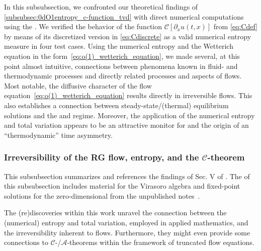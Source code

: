 In this subsubsection, we confronted our theoretical findings of \cref{subsubsec:0dO1entropy_c-function_tvd} with direct numerical computations using the \ktScheme{}.
We verified the behavior of the function $\mathcal{C} [ \partial_x u ( t, x ) ]$ from \cref{eq:Cdef} by means of its discretized version in \cref{eq:Cdiscrete} as a valid numerical entropy measure in four test cases.
Using the numerical entropy and the Wetterich equation in the form~\eqref{eq:o(1)_wetterich_equation}, we made several, at this point almost intuitive, connections between phenomena known in fluid- and thermodynamic processes and directly related processes and aspects of \grg{} flows.
Most notable, the diffusive character of the flow equation~\eqref{eq:o(1)_wetterich_equation} results directly in irreversible \frg{} flows.
This also establishes a connection between steady-state/(thermal) equilibrium solutions and the \uv{}  and \ir{} regime.
Moreover, the application of the numerical entropy and total variation appears to be an attractive monitor for \rgcy{} and the origin of an ``thermodynamic'' time asymmetry.

\subsubsection{Irreversibility of the RG flow, entropy, and the \texorpdfstring{$\mathcal{C}$}{C}-theorem}
\label{subsubsec:c-theorem_irreversibility_entropy}
\begin{disclaimer}
	This subsubsection summarizes and references the findings of Sec. V of .
	The  of this subsubsection includes material for the Virasoro algebra and fixed-point solutions for the zero-dimensional  from the unpublished notes~\cite{Koenigstein:fixedPoint}.
\end{disclaimer}
The (re)discoveries within this work unravel the connection between the (numerical) entropy and total variation, employed in applied mathematics, and the irreversibility inherent to \grg{} flows. Furthermore, they might even provide some connections to $\mathcal{C}$-/$\mathcal{A}$-theorems within the framework of truncated \frg{} flow equations. 

